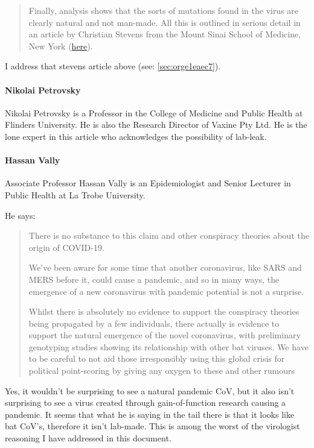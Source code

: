 \documentclass[11pt]{article}
\begin{document}
\begin{quote}
Finally, analysis shows that the sorts of mutations found in the virus are clearly natural and not man-made. All this is outlined in serious detail in an article by Christian Stevens from the Mount Sinai School of Medicine, New York (\href{https://archive.is/FjTGc}{here}).
\end{quote}
I address that stevens article above (see: \ref{sec:orge1eaec7}).

\paragraph{Nikolai Petrovsky}
\label{sec:org6f4d4c5}
Nikolai Petrovsky is a Professor in the College of Medicine and Public Health at Flinders University. He is also the Research Director of Vaxine Pty Ltd. He is the lone expert in this article who acknowledges the possibility of lab-leak.

\paragraph{Hassan Vally}
\label{sec:org9a32eb0}
Associate Professor Hassan Vally is an Epidemiologist and Senior Lecturer in Public Health at La Trobe University.

He says:
\begin{quote}
There is no substance to this claim and other conspiracy theories about the origin of COVID-19.

We’ve been aware for some time that another coronavirus, like SARS and MERS before it, could cause a pandemic, and so in many ways, the emergence of a new coronavirus with pandemic potential is not a surprise.

Whilst there is absolutely no evidence to support the conspiracy theories being propagated by a few individuals, there actually is evidence to support the natural emergence of the novel coronavirus, with preliminary genotyping studies showing its relationship with other bat viruses. We have to be careful to not aid those irresponsibly using this global crisis for political point-scoring by giving any oxygen to these and other rumours
\end{quote}
Yes, it wouldn't be surprising to see a natural pandemic CoV, but it also isn't surprising to see a virus created through gain-of-function research causing a pandemic. It seems that what he is saying in the tail there is that it looks like bat CoV's, therefore it isn't lab-made. This is among the worst of the virologist reasoning I have addressed in this document.
\end{document}
